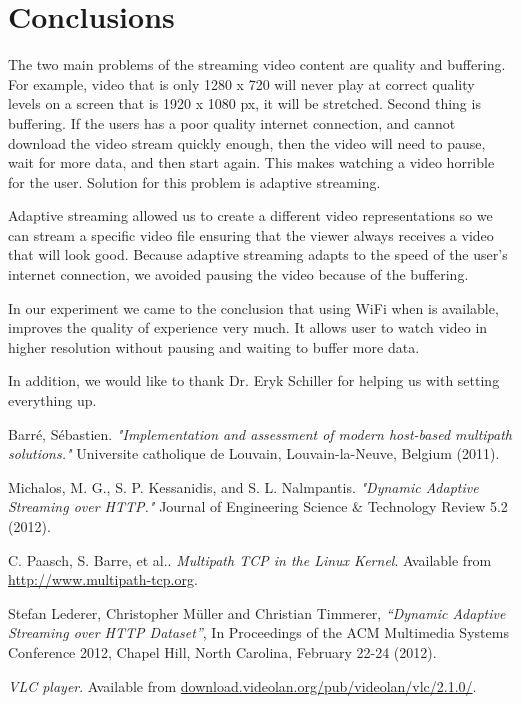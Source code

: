 \documentclass{llncs}
\begin{document}
\section{Conclusions}
The two main problems of the streaming video content are quality and buffering. For example, video that is only 1280 x 720 will never play at correct quality levels on a screen that is 1920 x 1080 px, it will be stretched. Second thing is  buffering. If the users has a poor quality internet connection, and cannot download the video stream quickly enough, then the video will need to pause, wait for more data, and then start again. This makes watching a video horrible for the user. Solution for this problem is adaptive streaming. 

Adaptive streaming allowed us to create a different video representations so we can stream a specific video file ensuring that the viewer always receives a video that will look good. Because adaptive streaming adapts to the speed of the user’s internet connection, we avoided pausing the video because of the buffering.

In our experiment we came to the conclusion that using WiFi when is available, improves the quality of experience very much. It allows user to watch video in higher resolution without pausing and waiting to buffer more data. 

In addition, we would like to thank Dr. Eryk Schiller for helping us with setting everything up. 



\begin{thebibliography}{1}
Barré, Sébastien. \emph{"Implementation and assessment of modern host-based multipath solutions." } Universite catholique de Louvain, Louvain-la-Neuve, Belgium (2011).

Michalos, M. G., S. P. Kessanidis, and S. L. Nalmpantis. \emph{"Dynamic Adaptive Streaming over HTTP."} Journal of Engineering Science \& Technology Review 5.2 (2012).

C. Paasch, S. Barre, et al.. \emph{Multipath TCP in the Linux Kernel}. Available from \url{http://www.multipath-tcp.org}.

Stefan Lederer, Christopher Müller and Christian Timmerer, \emph{“Dynamic Adaptive Streaming over HTTP Dataset”}, In Proceedings of the ACM Multimedia Systems Conference 2012, Chapel Hill, North Carolina, February 22-24 (2012). 

\emph{VLC player}. Available from \url{download.videolan.org/pub/videolan/vlc/2.1.0/}.

\end{thebibliography}
\end{document}
